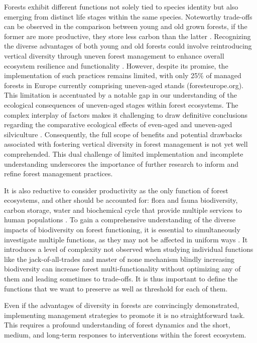 \documentclass{article}
\begin{document}
Forests exhibit different functions not solely tied to species identity but also emerging from distinct life stages within the same species. Noteworthy trade-offs can be observed in the comparison between young and old grown forests, if the former are more productive, they store less carbon than the latter \autocite{caspersenSuccessionalDiversityForest2001}. Recognizing the diverse advantages of both young and old forests could involve reintroducing vertical diversity through uneven forest management to enhance overall ecosystem resilience and functionality \autocite{guldinRoleUnevenAgedSilviculture1996}. However, despite its promise, the implementation of such practices remains limited, with only 25\% of managed forests in Europe currently comprising uneven-aged stands (foresteurope.org).
This limitation is accentuated by a notable gap in our understanding of the ecological consequences of uneven-aged stages within forest ecosystems. The complex interplay of factors makes it challenging to draw definitive conclusions regarding the comparative ecological effects of even-aged and uneven-aged silviculture \autocite{noletComparingEffectsEven2018}. Consequently, the full scope of benefits and potential drawbacks associated with fostering vertical diversity in forest management is not yet well comprehended. This dual challenge of limited implementation and incomplete understanding underscores the importance of further research to inform and refine forest management practices.

It is also reductive to consider productivity as the only function of forest ecosystems, and other should be accounted for: flora and fauna biodiversity, carbon storage, water and biochemical cycle that provide multiple services to human populations \autocite{aertsForestRestorationBiodiversity2011}.
To gain a comprehensive understanding of the diverse impacts of biodiversity on forest functioning, it is essential to simultaneously investigate multiple functions, as they may not be affected in uniform ways \autocite{korboulewskyHowTreeDiversity2016}. It introduces a level of complexity not observed when studying individual functions like the jack-of-all-trades and master of none mechanism \autocite{vanderplasJackofalltradesEffectsDrive2016} blindly increasing biodiversity can increase forest multi-functionality without optimizing any of them and leading sometimes to trade-offs. It is thus important to define the functions that we want to preserve as well as threshold for each of them.

Even if the advantages of diversity in forests are convincingly demonstrated, implementing management strategies to promote it is no straightforward task. This requires a profound understanding of forest dynamics and the short, medium, and long-term responses to interventions within the forest ecosystem.
\end{document}
